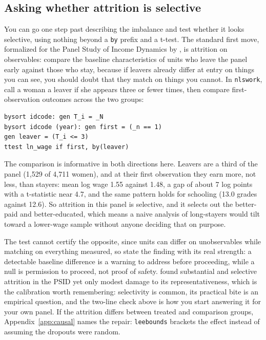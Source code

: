 \subsection{Asking whether attrition is selective}\label{sec:ch06-attrition}
You can go one step past describing the imbalance and test whether it looks selective, using nothing beyond a \texttt{by} prefix and a t-test. The standard first move, formalized for the Panel Study of Income Dynamics by \textcite{fitzgerald1998attrition}, is attrition on observables: compare the baseline characteristics of units who leave the panel early against those who stay, because if leavers already differ at entry on things you can see, you should doubt that they match on things you cannot. In \texttt{nlswork}, call a woman a leaver if she appears three or fewer times, then compare first-observation outcomes across the two groups:
\par
{\footnotesize
\begin{verbatim}
bysort idcode: gen T_i = _N
bysort idcode (year): gen first = (_n == 1)
gen leaver = (T_i <= 3)
ttest ln_wage if first, by(leaver)
\end{verbatim}
}
The comparison is informative in both directions here. Leavers are a third of the panel (1{,}529 of 4{,}711 women), and at their first observation they earn more, not less, than stayers: mean log wage 1.55 against 1.48, a gap of about 7 log points with a t-statistic near 4.7, and the same pattern holds for schooling (13.0 grades against 12.6). So attrition in this panel is selective, and it selects out the better-paid and better-educated, which means a naive analysis of long-stayers would tilt toward a lower-wage sample without anyone deciding that on purpose.

The test cannot certify the opposite, since units can differ on unobservables while matching on everything measured, so state the finding with its real strength: a detectable baseline difference is a warning to address before proceeding, while a null is permission to proceed, not proof of safety. \textcite{fitzgerald1998attrition} found substantial and selective attrition in the PSID yet only modest damage to its representativeness, which is the calibration worth remembering: selectivity is common, its practical bite is an empirical question, and the two-line check above is how you start answering it for your own panel. If the attrition differs between treated and comparison groups, Appendix~\ref{app:causal} names the repair: \texttt{leebounds} brackets the effect instead of assuming the dropouts were random.

